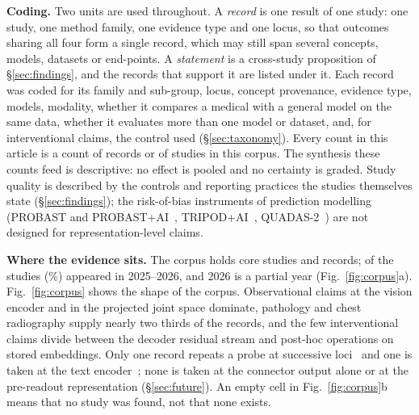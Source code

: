 \textbf{Coding.} Two units are used throughout. A \emph{record} is one result of one study: one study,
one method family, one evidence type and one locus, so that outcomes sharing all four form a single
record, which may still span several concepts, models, datasets or end-points. A \emph{statement} is a
cross-study proposition of \S\ref{sec:findings}, and the records that support it are listed under it.
Each record was coded for its family and sub-group, locus, concept provenance, evidence type, models,
modality, whether it compares a medical with a general model on the same data, whether it evaluates more
than one model or dataset, and, for interventional claims, the control used (\S\ref{sec:taxonomy}).
Every count in this article is a count of records or of studies in this corpus. The
synthesis these counts feed is descriptive: no effect is pooled and no certainty is graded. Study
quality is described by the controls and reporting practices the studies themselves state
(\S\ref{sec:findings}); the risk-of-bias instruments of prediction modelling (PROBAST and
PROBAST+AI~\cite{wolff2019probast,moons2025probast}, TRIPOD+AI~\cite{collins2024tripod},
QUADAS-2~\cite{whiting2011quadas}) are not designed for representation-level claims.

\textbf{Where the evidence sits.} The corpus holds \Ncore{} core studies and \Nclaims{} records;
\Nrecent{} of the studies (\Pctrecent\%) appeared in 2025--2026, and 2026 is a partial year
(Fig.~\ref{fig:corpus}a). Fig.~\ref{fig:corpus} shows the shape of the corpus. Observational
claims at the vision encoder and in the projected joint space dominate, pathology and chest radiography
supply nearly two thirds of the records, and the few interventional claims divide between the decoder
residual stream and post-hoc operations on stored embeddings. Only one record repeats a probe at
successive loci~\cite{zhu2026lost} and one is taken at the text encoder~\cite{tayebiarasteh2026self};
none is taken at the connector output alone or at the pre-readout representation (\S\ref{sec:future}).
An empty cell in Fig.~\ref{fig:corpus}b means that no study was found, not that none exists.
